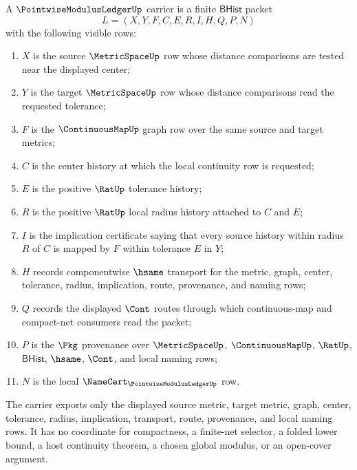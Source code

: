 \begin{definition}
\label{def:pointwise-modulus-ledger-carrier}
A $\PointwiseModulusLedgerUp$ carrier is a finite $\mathsf{BHist}$ packet
$$
L=(X,Y,F,C,E,R,I,H,Q,P,N)
$$
with the following visible rows:
\begin{enumerate}
\item $X$ is the source $\MetricSpaceUp$ row whose distance comparisons are tested near the displayed center;
\item $Y$ is the target $\MetricSpaceUp$ row whose distance comparisons read the requested tolerance;
\item $F$ is the $\ContinuousMapUp$ graph row over the same source and target metrics;
\item $C$ is the center history at which the local continuity row is requested;
\item $E$ is the positive $\RatUp$ tolerance history;
\item $R$ is the positive $\RatUp$ local radius history attached to $C$ and $E$;
\item $I$ is the implication certificate saying that every source history within radius $R$ of $C$ is mapped by $F$ within tolerance $E$ in $Y$;
\item $H$ records componentwise $\hsame$ transport for the metric, graph, center, tolerance, radius, implication, route, provenance, and naming rows;
\item $Q$ records the displayed $\Cont$ routes through which continuous-map and compact-net consumers read the packet;
\item $P$ is the $\Pkg$ provenance over $\MetricSpaceUp$, $\ContinuousMapUp$, $\RatUp$, $\mathsf{BHist}$, $\hsame$, $\Cont$, and local naming rows;
\item $N$ is the local $\NameCert_{\PointwiseModulusLedgerUp}$ row.
\end{enumerate}
The carrier exports only the displayed source metric, target metric, graph, center, tolerance, radius, implication, transport, route, provenance, and local naming rows. It has no coordinate for compactness, a finite-net selector, a folded lower bound, a host continuity theorem, a chosen global modulus, or an open-cover argument.
\end{definition}

